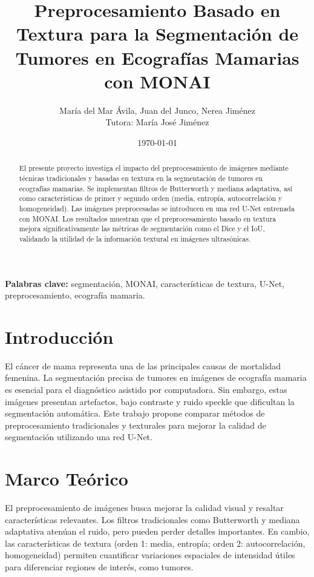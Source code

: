 \documentclass[12pt]{article}
\title{Preprocesamiento Basado en Textura para la Segmentación de Tumores en Ecografías Mamarias con MONAI}
\author{María del Mar Ávila, Juan del Junco, Nerea Jiménez\\Tutora: María José Jiménez}
\date{\today}
\begin{document}
\maketitle

\begin{abstract}
El presente proyecto investiga el impacto del preprocesamiento de imágenes mediante técnicas tradicionales y basadas en textura en la segmentación de tumores en ecografías mamarias. Se implementan filtros de Butterworth y mediana adaptativa, así como características de primer y segundo orden (media, entropía, autocorrelación y homogeneidad). Las imágenes preprocesadas se introducen en una red U-Net entrenada con MONAI. Los resultados muestran que el preprocesamiento basado en textura mejora significativamente las métricas de segmentación como el Dice y el IoU, validando la utilidad de la información textural en imágenes ultrasónicas.
\end{abstract}

\textbf{Palabras clave:} segmentación, MONAI, características de textura, U-Net, preprocesamiento, ecografía mamaria.

\section{Introducción}
El cáncer de mama representa una de las principales causas de mortalidad femenina. La segmentación precisa de tumores en imágenes de ecografía mamaria es esencial para el diagnóstico asistido por computadora. Sin embargo, estas imágenes presentan artefactos, bajo contraste y ruido speckle que dificultan la segmentación automática. Este trabajo propone comparar métodos de preprocesamiento tradicionales y texturales para mejorar la calidad de segmentación utilizando una red U-Net.

\section{Marco Teórico}
El preprocesamiento de imágenes busca mejorar la calidad visual y resaltar características relevantes. Los filtros tradicionales como Butterworth y mediana adaptativa atenúan el ruido, pero pueden perder detalles importantes. En cambio, las características de textura (orden 1: media, entropía; orden 2: autocorrelación, homogeneidad) permiten cuantificar variaciones espaciales de intensidad útiles para diferenciar regiones de interés, como tumores.
\end{document}
